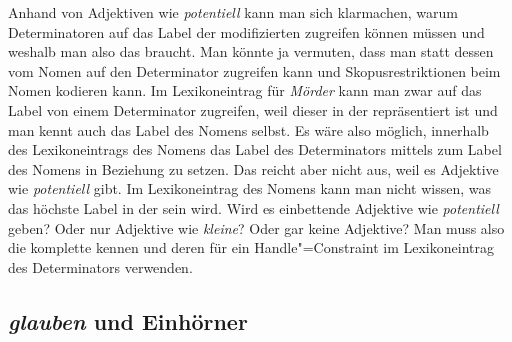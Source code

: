 Anhand von Adjektiven wie \emph{potentiell} kann man sich klarmachen, warum Determinatoren auf das Label der
modifizierten \nbar zugreifen können müssen und weshalb man also das \specm braucht. Man könnte ja
vermuten, dass man statt dessen vom Nomen auf den Determinator zugreifen kann und
Skopusrestriktionen beim Nomen kodieren kann. Im Lexikoneintrag für \emph{Mörder} kann man zwar
auf das Label von einem Determinator zugreifen, weil dieser in der \sprl repräsentiert ist und man
kennt auch das Label des Nomens selbst. Es wäre also möglich, innerhalb des Lexikoneintrags des
Nomens das Label des Determinators mittels \qeq zum Label des Nomens in Beziehung zu setzen. Das
reicht aber nicht aus, weil es Adjektive wie \emph{potentiell} gibt. Im Lexikoneintrag des Nomens
kann man nicht wissen, was das höchste Label in der \nbar sein wird. Wird es einbettende Adjektive
wie \emph{potentiell} geben? Oder nur Adjektive wie \emph{kleine}? Oder gar keine Adjektive? Man
muss also die komplette \nbar kennen und deren \ltopw für ein Handle"=Constraint im Lexikoneintrag
des Determinators verwenden. 

\subsection{\emph{glauben} und Einhörner}
\label{Abschnitt glauben und Einhörner}

